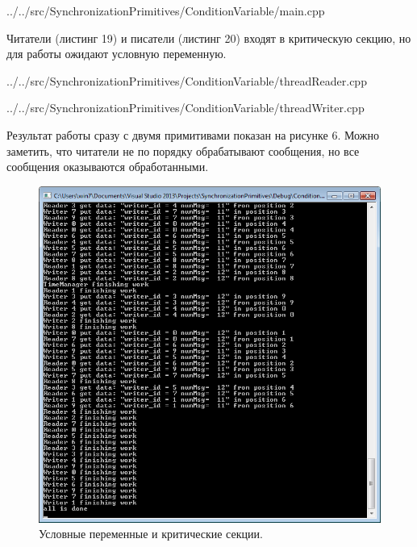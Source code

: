 \documentclass[a4paper, 12pt]{article}		%
\begin{document}

{../../src/SynchronizationPrimitives/ConditionVariable/main.cpp}

Читатели (листинг 19) и писатели (листинг 20) входят в критическую секцию, но для работы ожидают условную переменную.


{../../src/SynchronizationPrimitives/ConditionVariable/threadReader.cpp}


{../../src/SynchronizationPrimitives/ConditionVariable/threadWriter.cpp}
\newpage

Результат работы сразу с двумя примитивами показан на рисунке 6. Можно заметить, что читатели не по порядку обрабатывают сообщения, но все сообщения оказываются обработанными.

\begin{figure}[h!]
\centering
\includegraphics[scale=1]{res/005}
\caption{Условные переменные и критические секции.}
\end{figure}
\end{document}
